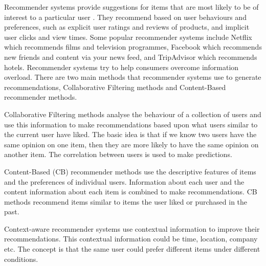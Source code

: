 Recommender systems provide suggestions for items that are most likely to be of interest to a particular user \cite{Ricci2015}. They recommend based on user behaviours and preferences, such as explicit user ratings and reviews of products, and implicit user clicks and view times. Some popular recommender systems include Netflix which recommends films and television programmes, Facebook which recommends new friends and content via your news feed, and TripAdvisor which recommends hotels. Recommender systems try to help consumers overcome information overload. There are two main methods that recommender systems use to generate recommendations, Collaborative Filtering methods and Content-Based recommender methods. 

Collaborative Filtering methods analyse the behaviour of a collection of users and use this information to make recommendations based upon what users similar to the current user have liked. The basic idea is that if we know two users have the same opinion on one item, then they are more likely to have the same opinion on another item. The correlation between users is used to make predictions.

Content-Based (CB) recommender methods use the descriptive features of items and the preferences of individual users. Information about each user and the content information about each item is combined to make recommendations. CB methods recommend items similar to items the user liked or purchased in the past.

Context-aware recommender systems use contextual information to improve their recommendations. This contextual information could be time, location, company etc. The concept is that the same user could prefer different items under different conditions.

